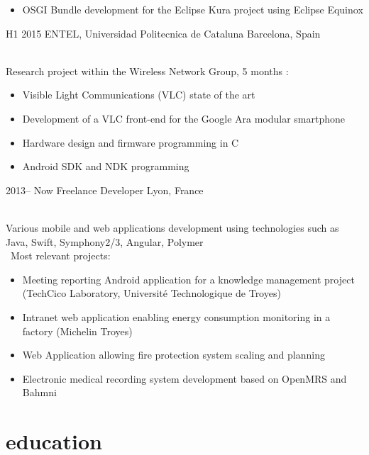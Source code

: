 \documentclass[]{cv-style}          %
\begin{document}
\begin{entrylist}
{\begin{itemize}
    \item OSGI Bundle development for the Eclipse Kura project using Eclipse Equinox
  \end{itemize}}
 \entry
  {H1 2015  }
  {ENTEL, Universidad Politecnica de Cataluna}
  {Barcelona, Spain}
  {\\
  Research project within the Wireless Network Group, 5 months :
  \begin{itemize}
    \item Visible Light Communications (VLC) state of the art
    \item Development of a VLC front-end for the Google Ara modular smartphone
    \item Hardware design and firmware programming in C
    \item Android SDK and NDK programming
  \end{itemize}}
\entry
  {2013-- Now}
  {Freelance Developer}
  {Lyon, France}
  {\\
  Various mobile and web applications development using technologies such as Java, Swift, Symphony2/3, Angular, Polymer\\\
  Most relevant projects:
  \begin{itemize}
    \item Meeting reporting Android application for a knowledge management project (TechCico Laboratory, Université Technologique de Troyes)
    \item Intranet web application enabling energy consumption monitoring in a factory (Michelin Troyes)
    \item Web Application allowing fire protection system scaling and planning
    \item Electronic medical recording system development based on OpenMRS and Bahmni
  \end{itemize}}
\end{entrylist}

\pagebreak
\section{education}
\end{document}
